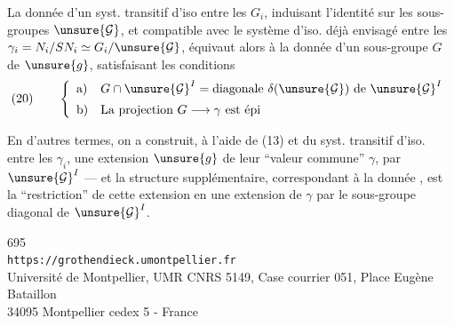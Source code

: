 La donnée d'un syst. transitif d'iso entre les $G_i$, induisant l'identité sur les sous-groupes $\unsure{\mathcal G}$, et compatible avec le système   d'iso. déjà envisagé entre les $\gamma_i=N_i/SN_i\simeq G_i/\unsure{\mathcal G}$, équivaut alors à la donnée d'un sous-groupe $G$ de $\unsure{g}$, satisfaisant les conditions
\[
(20)\qquad 
\left\{\begin{array}{ll}
\text{a)}&G\cap\unsure{\mathcal G}^I=\text{diagonale }\delta(\unsure{\mathcal G})\text{ de }\unsure{\mathcal G}^I\\[5pt]
\text{b)}&\text{La projection }G\longrightarrow\gamma\text{ est épi}
\end{array}\right.
\]

En d'autres termes, on a construit, à l'aide de (13) et du syst. transitif d'iso. entre les $\gamma_i$, une extension $\unsure{g}$ de leur ``valeur commune'' $\gamma$, par $\unsure{\mathcal G}^I$ --- et la structure supplémentaire, correspondant à la donnée , est la ``restriction'' de cette extension en une extension de $\gamma$ par le sous-groupe diagonal de $\unsure{\mathcal G}^I$.


\begin{center}
695\\
\texttt{https://grothendieck.umontpellier.fr}\\
Université de Montpellier, UMR CNRS 5149, Case courrier 051, Place Eugène Bataillon\\
34095 Montpellier cedex 5 - France
\end{center}
